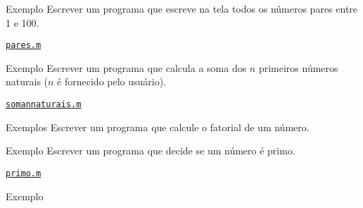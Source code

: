 \documentclass[hyperref={pdfpagelabels=false}]{beamer}
\begin{document}
\begin{frame}{Exemplo}
  Escrever um programa que escreve na tela todos os números pares entre 1 e 100.
	\vfill
	\begin{center} \href{listings/pares.m}{\underline{\texttt{pares.m}}} \end{center}
\end{frame}

\begin{frame}{Exemplo}
  Escrever um programa que calcula a soma dos $n$ primeiros números naturais ($n$ é fornecido pelo usuário).
	\vfill
	\begin{center} \href{listings/somannaturais.m}{\underline{\texttt{somannaturais.m}}} \end{center}
\end{frame}

\begin{frame}{Exemplos}
  Escrever um programa que calcule o fatorial de um número.
\end{frame}

\begin{frame}{Exemplo}
  Escrever um programa que decide se um número é primo.
  \vfill 
  \begin{center} \href{listings/primo.m}{\underline{\texttt{primo.m}}} \end{center}
\end{frame}

\begin{frame}{Exemplo}
\end{frame}
\end{document}
